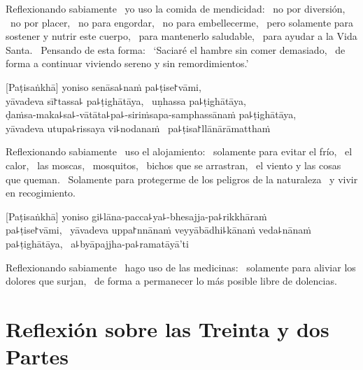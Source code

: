\begin{english}
  Reflexionando sabiamente \pause\ yo uso la comida de mendicidad: \pause\ no por
  diversión, \pause\ no por placer, \pause\ no para engordar, \pause\ no para
  embellecerme, \pause\ pero solamente para sostener y nutrir este cuerpo, \pause\
  para mantenerlo saludable, \pause\ para ayudar a la Vida Santa. \pause\ Pensando
  de esta forma: \pause\ `Saciaré el hambre sin comer demasiado, \pause\ de
  forma a continuar viviendo sereno y sin remordimientos.'
\end{english}

\clearpage

[Paṭisaṅkhā] yoniso senāsa꜕naṁ pa꜕ṭise꜓vāmi, \pause\\
yāvadeva sī꜓tassa꜕ pa꜕ṭighātāya, \pause\ uṇhassa pa꜕ṭighātāya, \pause\\
ḍaṁsa-maka꜕sa꜕-vātāta꜕pa꜕-siriṁsapa-samphassānaṁ pa꜕ṭighātāya, \pause\\
yāvadeva utupa꜕rissaya vi꜕nodanaṁ \pause\ pa꜕ṭisa꜓llānārāmatthaṁ

\begin{english}
  Reflexionando sabiamente \pause\ uso el alojamiento: \pause\ solamente para evitar el
  frío, \pause\ el calor, \pause\ las moscas, \pause\ mosquitos, \pause\ bichos
  que se arrastran, \pause\ el viento y las cosas que queman. \pause\ Solamente para
  protegerme de los peligros de la naturaleza \pause\ y vivir en recogimiento.
\end{english}

[Paṭisaṅkhā] yoniso gi꜕lāna-pacca꜕ya꜕-bhesajja-pa꜕rikkhāraṁ\\
pa꜕ṭise꜓vāmi, \pause\ yāvadeva uppa꜓nnānaṁ veyyābādhi꜕kānaṁ veda꜕nānaṁ
pa꜕ṭighātāya, \pause\ a꜕byāpajjha-pa꜕ramatāyā'ti

\begin{english}
  Reflexionando sabiamente \pause\ hago uso de las medicinas: \pause\ solamente para aliviar los dolores que surjan,
  \pause\ de forma a permanecer lo más posible libre de dolencias.
\end{english}

\chapter[Treinta y dos Partes]{Reflexión sobre las Treinta y dos Partes}


\begin{leader}
\end{leader}

